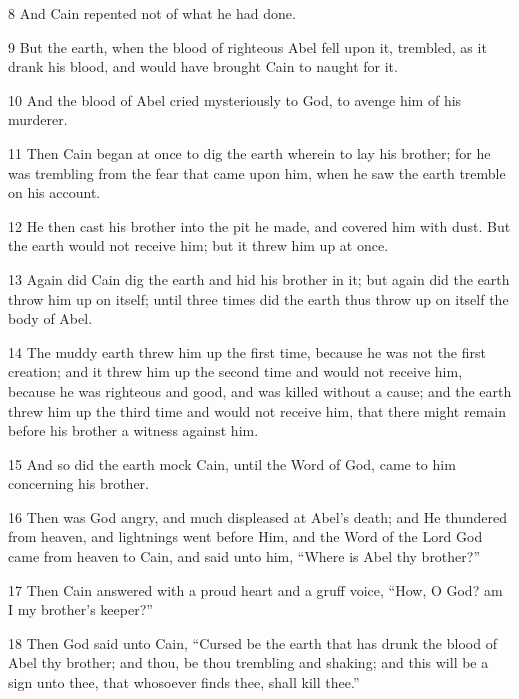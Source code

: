 \par 8 And Cain repented not of what he had done.

\par 9 But the earth, when the blood of righteous Abel fell upon it, trembled, as it drank his blood, and would have brought Cain to naught for it.

\par 10 And the blood of Abel cried mysteriously to God, to avenge him of his murderer.

\par 11 Then Cain began at once to dig the earth wherein to lay his brother; for he was trembling from the fear that came upon him, when he saw the earth tremble on his account.

\par 12 He then cast his brother into the pit he made, and covered him with dust. But the earth would not receive him; but it threw him up at once.

\par 13 Again did Cain dig the earth and hid his brother in it; but again did the earth throw him up on itself; until three times did the earth thus throw up on itself the body of Abel.

\par 14 The muddy earth threw him up the first time, because he was not the first creation; and it threw him up the second time and would not receive him, because he was righteous and good, and was killed without a cause; and the earth threw him up the third time and would not receive him, that there might remain before his brother a witness against him.

\par 15 And so did the earth mock Cain, until the Word of God, came to him concerning his brother.

\par 16 Then was God angry, and much displeased at Abel's death; and He thundered from heaven, and lightnings went before Him, and the Word of the Lord God came from heaven to Cain, and said unto him, “Where is Abel thy brother?”

\par 17 Then Cain answered with a proud heart and a gruff voice, “How, O God? am I my brother's keeper?”

\par 18 Then God said unto Cain, “Cursed be the earth that has drunk the blood of Abel thy brother; and thou, be thou trembling and shaking; and this will be a sign unto thee, that whosoever finds thee, shall kill thee.”

